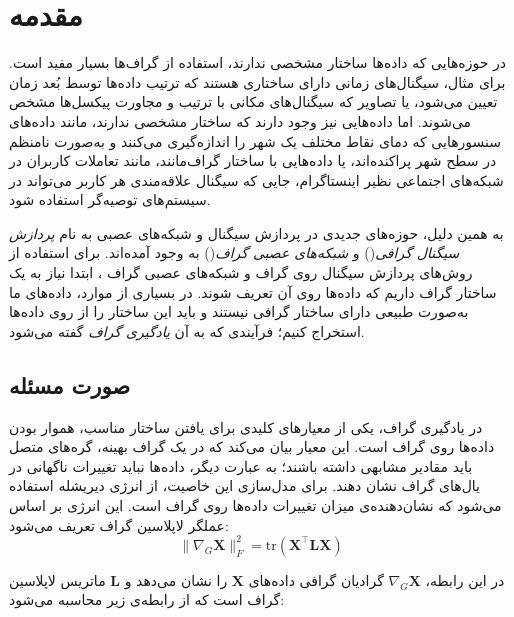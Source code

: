 \documentclass[10pt,twocolumn,a4paper]{article}
\begin{document}
    \section{مقدمه}
    در حوزه‌هایی که داده‌ها ساختار مشخصی ندارند، استفاده از گراف‌ها بسیار مفید است. برای مثال، سیگنال‌های زمانی دارای ساختاری هستند که ترتیب داده‌ها توسط بُعد زمان تعیین می‌شود، یا تصاویر که سیگنال‌های مکانی با ترتیب و مجاورت پیکسل‌ها مشخص می‌شوند. اما داده‌هایی نیز وجود دارند که ساختار مشخصی ندارند، مانند داده‌های سنسورهایی که دمای نقاط مختلف یک شهر را اندازه‌گیری می‌کنند و به‌صورت نامنظم در سطح شهر پراکنده‌اند، یا داده‌هایی با ساختار گراف‌مانند، مانند تعاملات کاربران در شبکه‌های اجتماعی نظیر اینستاگرام، جایی که سیگنال علاقه‌مندی هر کاربر می‌تواند در سیستم‌های توصیه‌گر استفاده شود.
    
    به همین دلیل، حوزه‌های جدیدی در پردازش سیگنال و شبکه‌های عصبی به نام 
	\textit{پردازش سیگنال گرافی}()\cite{GSP}
     و
	\textit{شبکه‌های عصبی گراف}()\cite{GNN}
      به وجود آمده‌اند.
      برای استفاده از روش‌های پردازش سیگنال روی گراف و شبکه‌های عصبی گراف ، ابتدا نیاز به یک ساختار گراف داریم که داده‌ها روی آن تعریف شوند. در بسیاری از موارد، داده‌های ما به‌صورت طبیعی دارای ساختار گرافی نیستند و باید این ساختار را از روی داده‌ها استخراج کنیم؛ فرآیندی که به آن 
            \textit{یادگیری گراف}
      گفته می‌شود.
      
     
     \subsection{صورت مسئله}
     
     
     
     در یادگیری گراف، یکی از معیارهای کلیدی برای یافتن ساختار مناسب، هموار بودن داده‌ها روی گراف است. این معیار بیان می‌کند که در یک گراف بهینه، گره‌های متصل باید مقادیر مشابهی داشته باشند؛ به عبارت دیگر، داده‌ها نباید تغییرات ناگهانی در یال‌های گراف نشان دهند. برای مدل‌سازی این خاصیت، از انرژی دیریشله استفاده می‌شود که نشان‌دهنده‌ی میزان تغییرات داده‌ها روی گراف است. این انرژی بر اساس عملگر لاپلاسین گراف تعریف می‌شود:
     \begin{equation}
     	     \|\nabla_G \bm{X}\|_F^2 = \text{tr} (\bm{X}^\top \bm{L} \bm{X})
     \end{equation}
     
     در این رابطه، \( \nabla_G \bm{X} \) گرادیان گرافی داده‌های \( \bm{X} \) را نشان می‌دهد و \( \bm{L} \) ماتریس لاپلاسین گراف است که از رابطه‌ی زیر محاسبه می‌شود:
     
\end{document}
